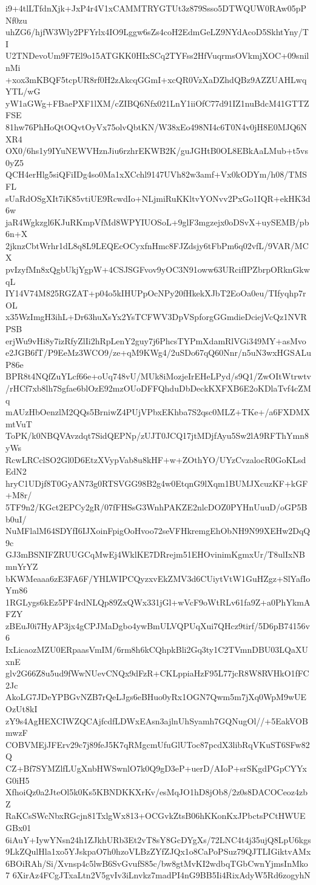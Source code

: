i9+4tlLTfdnXjk+JxP4r4V1xCAMMTRYGTUt3z879Ssso5DTWQUW0RAw05pPNf0zu
uhZG6/hjfW3Wly2PFYrlx4IO9Lggw6sZs4coH2EdmGeLZ9NYdAcoD5SkhtYny/TI
U2TNDevoUm9F7El9o15ATGKK0HIxSCq2TYFss2HfVuqrmsOVkmjXOC+09snilnMi
+xox3mKBQF5tcpUR8rf0H2zAkcqGGmI+xcQR0VzXaDZhdQBz9AZZUAHLwqYTL/wG
yW1aGWg+FBaePXF1lXM/cZIBQ6Nfx021LnY1iiOfC77d91IZ1nuBdcM41GTTZFSE
81hw76PhHoQtOQvtOyVx75olvQbtKN/W38xEo498NI4c6T0N4v0jH8E0MJQ6NXR4
OX0/6hs1y9IYuNEWVHznJiu6rzhrEKWB2K/guJGHtB0OL8EBkAaLMub+t5vs0yZ5
QCH4erHlg5siQFiIDg4so0Ma1xXCchl9147UVh82w3amf+Vx0kODYm/h08/TMSFL
sUaRdOSgXIt7iK85vtiUE9RcwdIo+NLjmiRuKKltvYONvv2PxGo1IQR+ekHK3d6w
jaR4Wgkzgl6KJuRKmpVfMd8WPYIUOSoL+9glF3mgzejx0oDSvX+uySEMB/pb6n+X
2jknzCbtWrhr1dL8q8L9LEQEcOCyxfnHmc8FJZdsjy6tFbPm6q02vfL/9VAR/MCX
pvIzyfMn8xQgbUkjYgpW+4CSJSGFvov9yOC3N91oww63URcifIPZbrpORknGkwqL
IY14V74M825RGZAT+p04o5kIHUPpOcNPy20fHkekXJbT2EoOa0eu/TIfyqhp7rOL
x35WzImgH3ihL+Dr63huXsYx2YsTCFWV3DpVSpforgGGmdieDciejVcQz1NVRPSB
erjWu9vHi8y7izRfyZlIi2hRpLenY2guy7j6PhcsTYPmXdamRlVGi349MY+asMvo
e2JGB6fT/P9EeMz3WCO9/ze+qM9KWg4/2uSDo67qQ60Nnr/n5uN3wxHGSALuP86e
BPR8t4NQfZuYLcf66e+oUq748vU/MUk8iMozjeIrEHeLPyd/s9Q1/ZwOItWtrwtv
/rHCf7xb8lh7Sgfae6blOzE92mzOUoDFFQhduDbDeckKXFXB6E2oKDlaTvf4cZMq
mAUzHbOenzlM2QQs5BrniwZ4PUjVPbxEKhba7S2qsc0MLZ+TKe+/a6FXDMXmtVuT
ToPK/k0NBQVAvzdqt7SidQEPNp/zUJT0JCQ17jtMDjfAyu5Sw2lA9RFThYmn8yWs
RcwLRCclSO2Gl0D6EtzXVypVab8u8kHF+w+ZOthYO/UYzCvzalocR0GoKLsdEdN2
hryC1UDjf8T0GyAN73g0RTSVGG98B2g4w0EtqnG9lXqm1BUMJXcuzKF+kGF+M8r/
5TF9n2/KGct2EPCy2gR/07fFHSsG3WnhPAKZE2nlcDOZ0PYHnUuuD/oGP5Bb0uI/
NuMFlalM64SDYfI6IJXoinFpigOoHvoo72seVFHkremgEhObNH9N99XEHw2DqQ9c
GJ3mBSNIFZRUUGCqMwEj4WklKE7DRrejm51EHOvinimKgmxUr/T8ulIxNBmnYrYZ
bKWMeaaa6zE3FA6F/YHLWIPCQyzxvEkZMV3d6CUiytVtW1GuHZgz+SlYafIoYm86
1RGLygs6kEz5PF4rdNLQp89ZxQWx331jGl+wVcF9oWtRLv61fa9Z+a0PhYkmAFZY
zBEuJ0i7HyAP3jx4gCPJMaDgbo4ywBmULVQPUqXui7QHcz9tirf/5D6pB74156v6
IxLicaozMZU0ERpaasVmIM/6rm8h6kCQhpkBli2Gq3ty1C2TVmnDBU03LQaXUxnE
glv2G66Z8u5ud9fWwNUevCNQx9dFzR+CKLppiaHzF95L77jcR8W8RVHkO1fFC2Jc
AkoLG7JDeYPBGvNZB7rQeLJgs6eBHuo0yRx1OGN7Qwm5m7jXq0WpM9wUEOzUt8kI
zY9s4AgHEXCIWZQCAjfcdfLDWxEAsn3ajlnUhSyamh7GQNugOl//+5EakVOBmwzF
COBVMEjJFErv29c7j89feJ5K7qRMgcmUfuGlUToc87pcdX3libRqVKuST6SFw82Q
CZ+Bf7SYMZlfLUgXnbHWSwnlO7k0Q9gD3eP+uerD/AIoP+srSKgdPGpCYYxG0iH5
XfhoiQz0a2JteOl5k0Ks5KBNDKKXrKv/esMqJO1hD8jOb8/2z0s8DACOCeoz4zbZ
RaKCsSWcNbxRGcjn81TxlgWx813+OCGvkZtsB06hKKonKxJPbctsPCtHWUEGBx01
6iAuY+IywYNsn24h1ZJkhURb3Et2vT8sY8GcDYgXs/72LNC4t4j35ujQ8LpU6kgs
9LkZQulHla1xo5YJskpaO7h0hzoVLBzZYfZJQx1o8CaPoPSuz79QJTLIGiktvAMx
6BOiRAh/Si/Xvnsp4c5lwB6SvGvufS85c/bw8gtMvKI2wdbqTGbCwnYjmsInMko7
6XirAz4FCgJTxaLtn2V5gvIv3iLnvkz7madPI4nG9BB5Ii4RixAdyW5Rd6zogyhN
